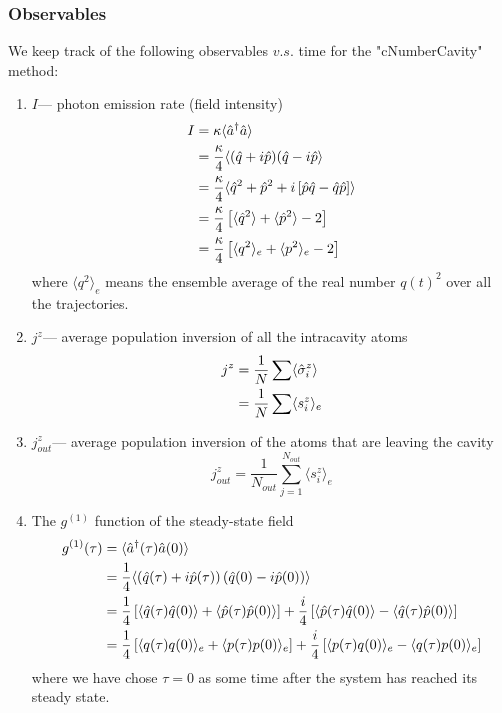 \documentclass{article}
\begin{document}
\subsubsection{Observables}
We keep track of the following observables $v.s.$ time for the "cNumberCavity" method:
\begin{enumerate}
    \item  $I$\---- photon emission rate (field intensity)
        \begin{align}
            \notag I &= \kappa \langle \hat{a}^\dagger \hat{a} \rangle\\
            \notag   &= \frac{\kappa}{4} \langle ( \hat{q}+i\hat{p})(\hat{q}-i\hat{p} \rangle\\
            \notag   &= \frac{\kappa}{4} \langle \hat{q}^2+\hat{p}^2+i\left[\hat{p}\hat{q}-\hat{q}\hat{p}\right] \rangle\\
            \notag   &= \frac{\kappa}{4}\left[\langle \hat{q}^2\rangle+\langle\hat{p}^2\rangle-2\right]\\
                     &= \frac{\kappa}{4}\left[\langle q^2 \rangle_e+\langle p^2 \rangle_e-2\right]
        \end{align}
        where $\langle q^2 \rangle_e$ means the ensemble average of the real number $q(t)^2$ over all the trajectories.
    \item $j^z$\---- average population inversion of all the intracavity atoms 
        \begin{align}
            \notag j^z &= \frac{1}{N}\sum \langle \hat{\sigma}^z _i\rangle\\
                       &= \frac{1}{N}\sum \langle s_i^z\rangle_e
        \end{align}
        
    \item $j^z_{out}$\---- average population inversion of the atoms that are leaving the cavity 
        \begin{equation}
            j^z_{out} = \frac{1}{N_{out}} \sum_{j=1}^{N_{out}}\langle s_i^z\rangle_e
        \end{equation}
    \item The $g^{(1)}$ function of the steady-state field
        \begin{align}
            \notag g^{(1)}(\tau) &= \langle \hat{a}^\dagger(\tau) \hat{a}(0) \rangle\\
            \notag   &= \frac{1}{4} \langle \left( \hat{q}(\tau)+i\hat{p}(\tau)\right)\left(\hat{q}(0)-i\hat{p}(0) \right)\rangle\\
            \notag   &= \frac{1}{4} \left[\langle\hat{q}(\tau)\hat{q}(0)\rangle+\langle\hat{p}(\tau)\hat{p}(0)\rangle\right]+\frac{i}{4}\left[\langle\hat{p}(\tau)\hat{q}(0)\rangle-\langle\hat{q}(\tau)\hat{p}(0)\rangle\right]\\
                     &= \frac{1}{4} \left[\langle q(\tau)q(0)\rangle_e+\langle p(\tau)p(0)\rangle_e\right]+\frac{i}{4}\left[\langle p(\tau)q(0)\rangle_e-\langle q(\tau)p(0)\rangle_e\right]
        \end{align}
        where we have chose $\tau = 0$ as some time after the system has reached its steady state.
        

\end{enumerate}
\end{document}

